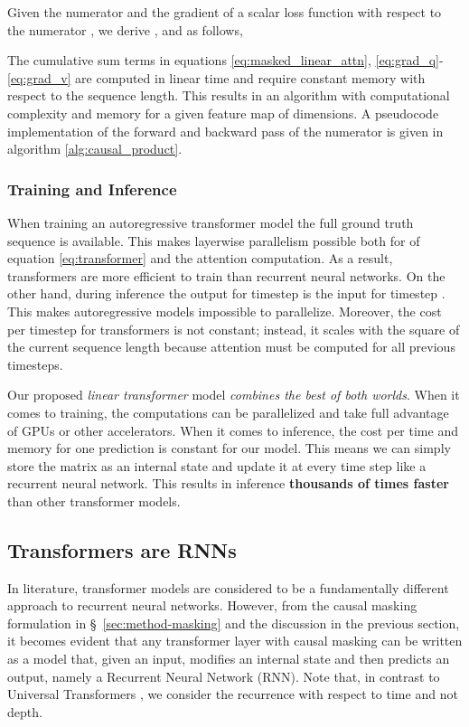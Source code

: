 \documentclass{article}
\newcommand{\linear}{\emph{linear transformer}}
\begin{document}
Given the numerator  and the gradient of a scalar loss function with
respect to the numerator , we derive
,  and  as follows,

The cumulative sum terms in equations \ref{eq:masked_linear_attn},
\ref{eq:grad_q}-\ref{eq:grad_v} are computed in linear time and require
constant memory with respect to the sequence length. This results in an
algorithm with computational complexity  and memory  for a given feature map of  dimensions. A pseudocode
implementation of the forward and backward pass of the numerator is given in
algorithm \ref{alg:causal_product}.

\subsubsection{Training and Inference}

When training an autoregressive transformer model the full ground truth
sequence is available. This makes layerwise parallelism possible both for
 of equation \ref{eq:transformer} and the attention computation.
As a result, transformers are more efficient to train than recurrent neural
networks. On the other hand, during inference the output for timestep  is
the input for timestep . This makes autoregressive models impossible to
parallelize. Moreover, the cost per timestep for transformers is not constant;
instead, it scales with the square of the current sequence length because
attention must be computed for all previous timesteps.

Our proposed \linear{} model \emph{combines the best of both worlds}.
When it comes to training, the computations can be parallelized and take full
advantage of GPUs or other accelerators. When it comes to inference, the cost
per time and memory for one prediction is constant for our model. This means we
can simply store the  matrix as an internal state and update it
at every time step like a recurrent neural network. This results in inference
\textbf{thousands of times faster} than other transformer models.

\subsection{Transformers are RNNs} \label{sec:method-trnn}

In literature, transformer models are considered to be a fundamentally
different approach to recurrent neural networks. However, from the causal
masking formulation in \S~\ref{sec:method-masking} and the discussion in the
previous section, it becomes evident that any transformer layer with causal
masking can be written as a model that, given an input, modifies an internal
state and then predicts an output, namely a Recurrent Neural Network (RNN). Note that, in contrast to
Universal Transformers \cite{dehghani2018universal}, we consider the recurrence
with respect to time and not depth.
\end{document}
